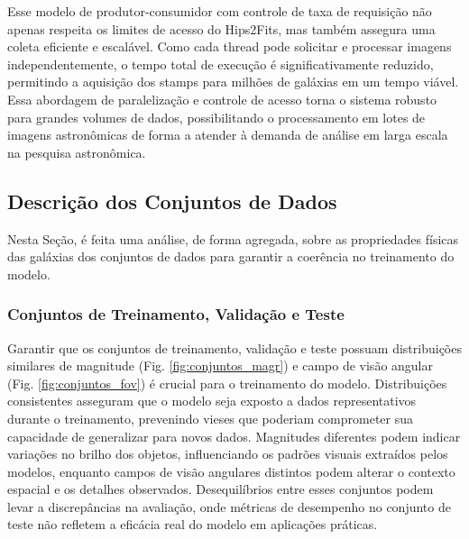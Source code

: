 Esse modelo de produtor-consumidor com controle de taxa de requisição não apenas respeita os limites de acesso do Hips2Fits, mas também assegura uma coleta eficiente e escalável. Como cada thread pode solicitar e processar imagens independentemente, o tempo total de execução é significativamente reduzido, permitindo a aquisição dos stamps para milhões de galáxias em um tempo viável. Essa abordagem de paralelização e controle de acesso torna o sistema robusto para grandes volumes de dados, possibilitando o processamento em lotes de imagens astronômicas de forma a atender à demanda de análise em larga escala na pesquisa astronômica.





\subsection{Descrição dos Conjuntos de Dados}
\label{sec:aquisicao-descricao}

Nesta Seção, é feita uma análise, de forma agregada, sobre as propriedades físicas das galáxias dos conjuntos de dados para garantir a coerência no treinamento do modelo.

\subsubsection{Conjuntos de Treinamento, Validação e Teste}
\label{sec:aquisicao-treinamento}

Garantir que os conjuntos de treinamento, validação e teste possuam distribuições similares de magnitude (Fig. \ref{fig:conjuntos_magr}) e campo de visão angular (Fig. \ref{fig:conjuntos_fov}) é crucial para o treinamento do modelo. Distribuições consistentes asseguram que o modelo seja exposto a dados representativos durante o treinamento, prevenindo vieses que poderiam comprometer sua capacidade de generalizar para novos dados. Magnitudes diferentes podem indicar variações no brilho dos objetos, influenciando os padrões visuais extraídos pelos modelos, enquanto campos de visão angulares distintos podem alterar o contexto espacial e os detalhes observados. Desequilíbrios entre esses conjuntos podem levar a discrepâncias na avaliação, onde métricas de desempenho no conjunto de teste não refletem a eficácia real do modelo em aplicações práticas.

